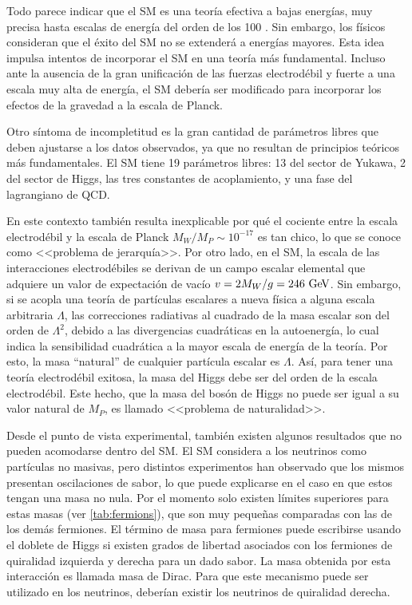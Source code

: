 Todo parece indicar que el SM es una teoría efectiva a bajas energías, muy
precisa hasta escalas de energía del orden de los 100 {\gev}. Sin embargo, los
físicos consideran que el éxito del SM no se extenderá a energías mayores. Esta
idea impulsa intentos de incorporar el SM en una teoría más fundamental. Incluso
ante la ausencia de la gran unificación de las fuerzas electrodébil y fuerte a
una escala muy alta de energía, el SM debería ser modificado para incorporar los
efectos de la gravedad a la escala de Planck.

Otro síntoma de incompletitud es la gran cantidad de parámetros libres que deben
ajustarse a los datos observados, ya que no resultan de principios teóricos más
fundamentales. El SM tiene 19 parámetros libres: 13 del sector de Yukawa, 2 del
sector de Higgs, las tres constantes de acoplamiento, y una fase del lagrangiano
de QCD.

En este contexto también resulta inexplicable por qué el cociente entre la escala
electrodébil y la escala de Planck $M_W/M_P \sim 10^{-17}$ es tan chico, lo que
se conoce como <<problema de jerarquía>>.
Por otro lado, en el SM, la escala de las interacciones electrodébiles se derivan de un
campo escalar elemental que adquiere un valor de expectación de vacío $v = 2
M_W /g = 246 \gev$. Sin embargo, si se acopla una teoría de partículas
escalares a nueva física a alguna escala arbitraria $\Lambda$, las correcciones
radiativas al cuadrado de la masa escalar son del orden de $\Lambda^2$, debido a
las divergencias cuadráticas en la autoenergía, lo cual indica la sensibilidad
cuadrática a la mayor escala de energía de la teoría. Por esto, la masa
``natural'' de cualquier partícula escalar es $\Lambda$. Así, para tener una teoría
electrodébil exitosa, la masa del Higgs debe ser del orden de la escala
electrodébil. Este hecho, que la masa del bosón de Higgs no puede ser igual a su
valor natural de $M_P$, es llamado <<problema de naturalidad>>.

Desde el punto de vista experimental, también existen algunos resultados que no
pueden acomodarse dentro del SM. El SM considera a los neutrinos como partículas
no masivas, pero distintos
experimentos\cite{PhysRevLett.101.111301,PhysRevD.78.032002} han observado que
los mismos presentan oscilaciones de sabor, lo que puede explicarse en el caso
en que estos tengan una masa no nula. Por el momento solo existen límites
superiores para estas masas (ver \cref{tab:fermions}), que son muy peque\~nas
comparadas con las de los demás fermiones. El término de masa para fermiones
puede escribirse usando el doblete de Higgs si existen grados de libertad
asociados con los fermiones de quiralidad izquierda y derecha para un dado
sabor. La masa obtenida por esta interacción es llamada masa de Dirac. Para que
este mecanismo puede ser utilizado en los neutrinos, deberían existir los
neutrinos de quiralidad derecha.

